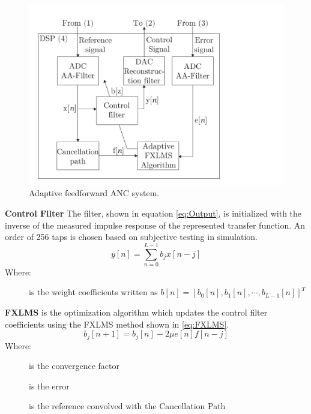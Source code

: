 \begin{figure}[H]
	\includegraphics[width=1\columnwidth]{figures/ArticleIllustrations/ANCFeedForward}
	\caption{Adaptive feedforward ANC system.}
	\label{fig:ANCFeedforward}
\end{figure}



\textbf{Control Filter} The filter, shown in equation \ref{eq:Output}, is initialized with the inverse of the measured impulse response of the represented transfer function. An order of 256 taps is chosen based on subjective testing in simulation.
\vspace{-3mm} %
\begin{equation}\label{eq:Output}
y[n]=\sum_{n=0}^{L-1}b_jx[n-j]
\end{equation}
Where:
\vspace{-7mm} %
\begin{description}
	\item[] is the weight coefficients written as  $b[n]=[b_0[n],b_1[n], \cdots, b_{L-1}[n]]^T$
\end{description}

\textbf{FXLMS} is the optimization algorithm which updates the control filter coefficients using the FXLMS method shown in \autoref{eq:FXLMS}.
\begin{equation}\label{eq:FXLMS}
b_j[n+1] = b_j[n] - 2\mu e[n]f[n-j]
\end{equation}
Where:
\vspace{-8mm} %
\begin{description}
	\item[\text{$\mu$}] is the convergence factor
	\item[] is the error 
	\item[] is the reference convolved with the Cancellation Path
\end{description}

